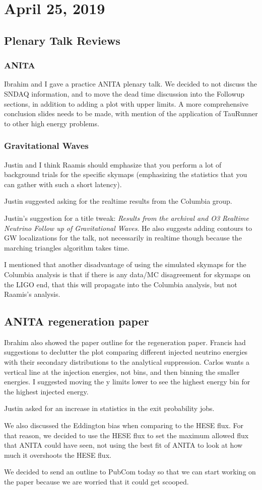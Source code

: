 \chapter{April 25, 2019}

\section{Plenary Talk Reviews}
\subsection{ANITA}
Ibrahim and I gave a practice ANITA plenary talk. We decided to not discuss the SNDAQ information, and to move the dead time discussion into the Followup sections, in addition to adding a plot with upper limits. A more comprehensive conclusion slides needs to be made, with mention of the application of TauRunner to other high energy problems.

\subsection{Gravitational Waves}
Justin and I think Raamis should emphasize that you perform a lot of background trials for the specific skymaps (emphasizing the statistics that you can gather with such a short latency).

Justin suggested asking for the realtime results from the Columbia group.

Justin's suggestion for a title tweak: \textit{Results from the archival and O3 Realtime Neutrino Follow up of Gravitational Waves}. He also suggests adding contours to GW localizations for the talk, not necessarily in realtime though because the marching triangles algorithm takes time.

I mentioned that another disadvantage of using the simulated skymaps for the Columbia analysis is that if there is any data/MC disagreement for skymaps on the LIGO end, that this will propagate into the Columbia analysis, but not Raamis's analysis. 

\section{ANITA regeneration paper}
Ibrahim also showed the paper outline for the regeneration paper. Francis had suggestions to declutter the plot comparing different injected neutrino energies with their secondary distributions to the analytical suppression. Carlos wants a vertical line at the injection energies, not bins, and then binning the smaller energies. I suggested moving the y limits lower to see the highest energy bin for the highest injected energy.

Justin asked for an increase in statistics in the exit probability jobs.

We also discussed the Eddington bias when comparing to the HESE flux. For that reason, we decided to use the HESE flux to set the maximum allowed flux that ANITA could have seen, not using the best fit of ANITA to look at how much it overshoots the HESE flux.

We decided to send an outline to PubCom today so that we can start working on the paper because we are worried that it could get scooped. 
